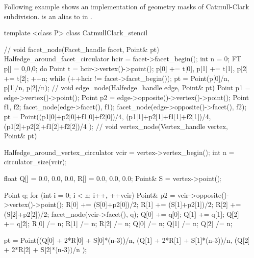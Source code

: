 
Following example shows an implementation of geometry masks 
of Catmull-Clark subdivision.  is an alias to 
in .

\begin{ccExampleCode}
template <class P>
class CatmullClark_stencil {
  //
  void facet_node(Facet_handle facet, Point& pt) {
    Halfedge_around_facet_circulator hcir = facet->facet_begin();
    int n = 0;
    FT p[] = {0,0,0};
    do {
      Point t = hcir->vertex()->point();
      p[0] += t[0], p[1] += t[1], p[2] += t[2]; 
      ++n;
    } while (++hcir != facet->facet_begin());
    pt = Point(p[0]/n, p[1]/n, p[2]/n);
  }
  //
  void edge_node(Halfedge_handle edge, Point& pt) {
    Point p1 = edge->vertex()->point();
    Point p2 = edge->opposite()->vertex()->point();
    Point f1, f2;
    facet_node(edge->facet(), f1);
    facet_node(edge->opposite()->facet(), f2);
    pt = Point((p1[0]+p2[0]+f1[0]+f2[0])/4,
               (p1[1]+p2[1]+f1[1]+f2[1])/4,
               (p1[2]+p2[2]+f1[2]+f2[2])/4 );
  }
  //
  void vertex_node(Vertex_handle vertex, Point& pt) {
    Halfedge_around_vertex_circulator vcir = vertex->vertex_begin();
    int n = circulator_size(vcir);    

    float Q[] = {0.0, 0.0, 0.0}, R[] = {0.0, 0.0, 0.0};
    Point& S = vertex->point();
    
    Point q;
    for (int i = 0; i < n; i++, ++vcir) {
      Point& p2 = vcir->opposite()->vertex()->point();
      R[0] += (S[0]+p2[0])/2;
      R[1] += (S[1]+p2[1])/2;
      R[2] += (S[2]+p2[2])/2;
      facet_node(vcir->facet(), q);
      Q[0] += q[0];      
      Q[1] += q[1];      
      Q[2] += q[2];
    }
    R[0] /= n;    R[1] /= n;    R[2] /= n;
    Q[0] /= n;    Q[1] /= n;    Q[2] /= n;
      
    pt = Point((Q[0] + 2*R[0] + S[0]*(n-3))/n,
               (Q[1] + 2*R[1] + S[1]*(n-3))/n,
               (Q[2] + 2*R[2] + S[2]*(n-3))/n );
  }
}
\end{ccExampleCode}

